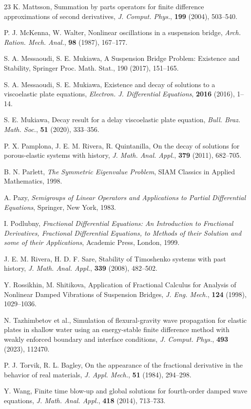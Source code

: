 \documentclass[12pt]{article}
\numberwithin{equation}{section}
\begin{document}
\begin{thebibliography}{23}
K. Mattsson, Summation by parts operators for finite difference approximations of second derivatives, {\it J. Comput. Phys.}, \textbf{199} (2004), 503--540.

P. J. McKenna, W. Walter, Nonlinear oscillations in a suspension bridge, {\it Arch. Ration. Mech. Anal.}, \textbf{98} (1987), 167--177.

S. A. Messaoudi, S. E. Mukiawa, A Suspension Bridge Problem: Existence and Stability, Springer Proc. Math. Stat., 190 (2017), 151--165.

S. A. Messaoudi, S. E. Mukiawa, Existence and decay of solutions to a viscoelastic plate equations, {\it Electron. J. Differential Equations}, \textbf{2016} (2016), 1--14.

S. E. Mukiawa, Decay result for a delay viscoelastic plate equation, {\it Bull. Braz. Math. Soc.}, \textbf{51} (2020), 333--356.

P. X. Pamplona, J. E. M. Rivera, R. Quintanilla, On the decay of solutions for porous-elastic systems with history, {\it J. Math. Anal. Appl.}, \textbf{379} (2011), 682--705.

B. N. Parlett, {\em The Symmetric Eigenvalue Problem}, SIAM Classics in Applied Mathematics, 1998.

A. Pazy, {\em Semigroups of Linear Operators and Applications to Partial Differential Equations}, Springer, New York, 1983.

I. Podlubny, {\em Fractional Differential Equations: An Introduction to Fractional Derivatives, Fractional Differential Equations, to Methods of their Solution and some of their Applications}, Academic Press, London, 1999.

J. E. M. Rivera, H. D. F. Sare, Stability of Timoshenko systems with past history, {\it J. Math. Anal. Appl.}, \textbf{339} (2008), 482--502.

Y. Rossikhin, M. Shitikova, Application of Fractional Calculus for Analysis of Nonlinear Damped Vibrations of Suspension Bridges, {\it J. Eng. Mech.}, \textbf{124} (1998), 1029--1036.

N. Tazhimbetov et al., Simulation of flexural-gravity wave propagation for elastic plates in shallow water using an energy-stable finite difference method with weakly enforced boundary and interface conditions, {\it J. Comput. Phys.}, \textbf{493} (2023), 112470.


P. J. Torvik, R. L. Bagley, On the appearance of the fractional derivative in the behavior of real materials, {\it J. Appl. Mech.}, \textbf{51} (1984), 294--298.


Y. Wang, Finite time blow-up and global solutions for fourth-order damped wave equations, {\it J. Math. Anal. Appl.}, \textbf{418} (2014), 713--733.

\end{thebibliography}
\end{document}
